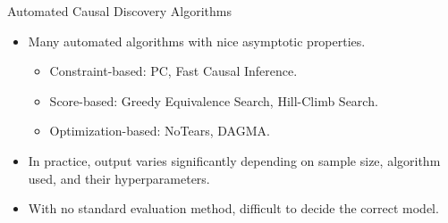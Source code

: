 \documentclass{beamer}
\begin{document}
\begin{frame}{Automated Causal Discovery Algorithms}
	\begin{itemize}
		\item Many automated algorithms with nice asymptotic properties.
			\begin{itemize}
				\item Constraint-based: PC, Fast Causal Inference.
				\item Score-based: Greedy Equivalence Search, Hill-Climb Search.
				\item Optimization-based: NoTears, DAGMA.
			\end{itemize}
		\item In practice, output varies significantly depending on sample size,
			algorithm used, and their hyperparameters.
		\item With no standard evaluation method, difficult to decide the correct model.
	\end{itemize}
\end{frame}
\end{document}
